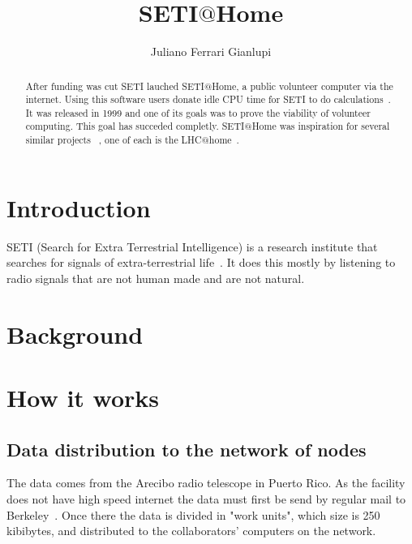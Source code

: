 
\title{SETI$@$Home}

\author{Juliano Ferrari Gianlupi}


\renewcommand{\shortauthors}{J. F. Gianlupi}


\begin{abstract}
After funding was cut SETI lauched SETI$@$Home, a public volunteer computer 
via the internet. Using this software users donate idle CPU time for SETI to do 
calculations~\cite{hid-sp18-601-www-sathome-about}. It was released in 1999 and 
one of its goals was to prove the viability of volunteer computing. This goal 
has succeded completly. SETI$@$Home was inspiration for several similar projects
 ~\cite{hid-sp18-601-www-boinc-projects}, one of each is the 
 LHC$@$home~\cite{hid-sp18-601-www-lhc-at-home-history}.
\end{abstract}



\maketitle

\section{Introduction}

SETI (Search for Extra Terrestrial Intelligence) is a research institute that 
searches for signals of extra-terrestrial 
life~\cite{hid-sp18-601-paper-cocconi1959searching}. It does this mostly by 
listening to radio signals that are not human made and are not natural. 

\section{Background}



\section{How it works}
\label{hid-sp18-601-section-howworks}
\subsection{Data distribution to the network of nodes}
\label{hid-sp18-601-subsection-data-dist}
The data comes from the Arecibo radio telescope in Puerto Rico. As the facility
does not have high speed internet the data must first be send by regular mail to
 Berkeley~\cite{hid-sp18-601-www-sathome-howworks}. Once there the data is 
 divided in "work units", which size is 250 kibibytes, and distributed to the 
 collaborators' computers on the network.


